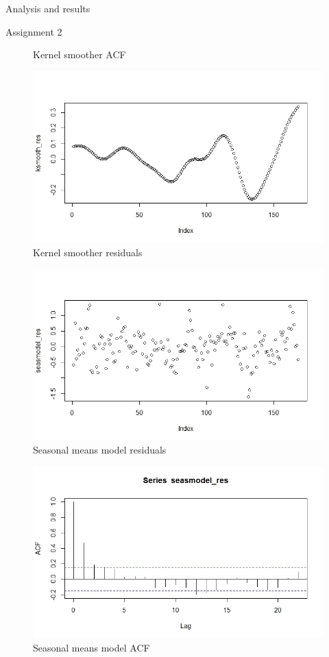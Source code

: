 \documentclass{article}
\begin{document}
\begin{section}{Analysis and results}
\begin{subsection}{Assignment 2}
\begin{figure}[ht!]
    \caption{Kernel smoother ACF}
    \label{fig:ksmooth_acf}
\end{figure}
\begin{figure}[ht!]
    \centering
    \includegraphics[scale=0.4]{ksmoothRES}
    \caption{Kernel smoother residuals}
    \label{fig:ksmooth_res}
\end{figure}
\begin{figure}[ht!]
    \centering
    \includegraphics[scale=0.4]{seasmodel_res1}
    \caption{Seasonal means model residuals}
    \label{fig:seasmodel_res}
\end{figure}
\begin{figure}[ht!]
    \centering
    \includegraphics[scale=0.4]{seasmodel_res}
    \caption{Seasonal means model ACF}
    \label{fig:seasmodel_acf}
\end{figure}
\end{subsection}


\end{section}
\end{document}
